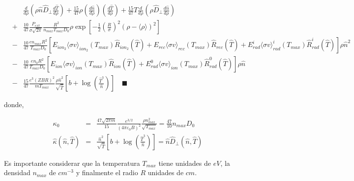 \begin{eqnarray}
	&& \frac{d}{d\rho}\left(\rho \hat{n} \hat{D}_\perp\frac{d\hat{T}}{d\rho} \right) + \frac{15}{47}\rho\left(\frac{d\hat{n}}{d\rho}\right)\left(\frac{d\hat{T}}{d\rho}\right) + \frac{15}{47}\hat{T}\frac{d}{d\rho}\left(\rho \hat{D}_\perp \frac{d\hat{n}}{d\rho}\right) \nonumber \\ 
	&+& \frac{10}{47}\frac{P_{ext}}{\sigma\sqrt{2\pi}}\frac{R^2}{n_{max}T_{max}D_0}\rho\exp{\left[-\frac{1}{2}\left(\frac{R}{\sigma}\right)^2(\rho - \langle \rho \rangle)^2\right]} \nonumber \\
	&-& \frac{10}{47}\frac{ e n_{max}R^2}{T_{max} D_0}\left[ E_{ion_2}\langle \sigma v \rangle_{ion_2}(T_{max})\hat{R}_{ion_2}(\hat{T}) + E_{rec}\langle \sigma v \rangle_{rec}(T_{max})\hat{R}_{rec}(\hat{T}) + E_{rad}^i\langle \sigma v \rangle_{rad}^i(T_{max})\hat{R}_{rad}^i(\hat{T})\right]\rho\hat{n}^2 \nonumber \\
	&-& \frac{10}{47}\frac{e n_0R^2}{T_{max}D_0}\left[ E_{ion}\langle \sigma v \rangle_{ion}(T_{max})\hat{R}_{ion}(\hat{T}) + E_{rad}^0\langle \sigma v \rangle_{ion}(T_{max})\hat{R}_{rad}^0(\hat{T}) \right]\rho\hat{n} \nonumber \\ 
	&-&\frac{15}{47}\frac{e^3(ZBR)^2}{mT_{max}}\frac{\rho \hat{n}^2}{\sqrt{\hat{T}}}\left[ b + \log{ \left( \frac{\hat{T}^3}{\hat{n}}\right)} \right] \quad \blacksquare
\end{eqnarray}

donde,

\begin{eqnarray}
	\kappa_0 &=& \frac{47\sqrt{2\pi m}}{15}\frac{e^{3/2}}{(4\pi \varepsilon_0 B)^2}\frac{\rho n^2_{max}}{\sqrt{T_{max}}} = \frac{47}{10}n_{max}D_0\\
	\hat{\kappa}(\hat{n}, \hat{T}) &=& \frac{\hat{n}^2}{\sqrt{\hat{T}}} \left[ b + \log{\left(\frac{\hat{T}^3}{\hat{n}} \right)}\right] = \hat{n}\hat{D}_\perp(\hat{n}, \hat{T})
\end{eqnarray}

Es importante considerar que la temperatura $T_{max}$ tiene unidades de $eV$, la densidad $n_{max}$ de $cm^{-3}$ y finalmente el radio $R$ unidades de $cm$.
